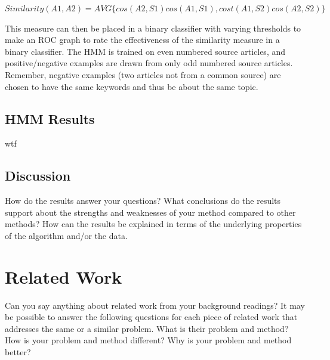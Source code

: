 \documentclass[11pt,letterpaper,oneside, titlepage]{scrartcl}
\begin{document}
$Similarity(A1, A2) = AVG\{ cos(A2, S1)cos(A1, S1) , cost(A1, S2)cos(A2, S2) \}$

This measure can then be placed in a binary classifier with varying thresholds to make an ROC graph to rate the effectiveness of the similarity measure in a binary classifier. The HMM is trained on even numbered source articles, and positive/negative examples are drawn from only odd numbered source articles. Remember, negative examples (two articles not from a common source) are chosen to have the same keywords and thus be about the same topic.

\subsection{HMM Results}

wtf


\subsection{Discussion}

How do the results answer your questions? What conclusions do the results support about the strengths and weaknesses of your method compared to other methods? How can the results be explained in terms of the underlying properties of the algorithm and/or the data. 

\section{Related Work}

Can you say anything about related work from your background readings? It may be possible to answer the following questions for each piece of related work that addresses the same or a similar problem. What is their problem and method? How is your problem and method different? Why is your problem and method better? 
\end{document}

